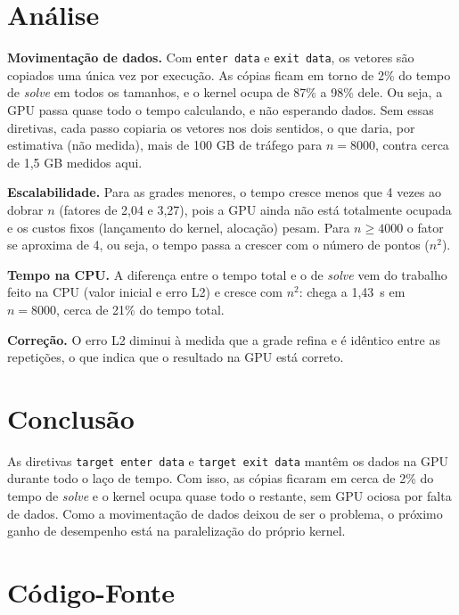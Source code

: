 \documentclass[a4paper,12pt]{article}
\begin{document}
\section{Análise}

\textbf{Movimentação de dados.} Com \texttt{enter data} e \texttt{exit data}, os
vetores são copiados uma única vez por execução. As cópias ficam em torno de
2\% do tempo de \textit{solve} em todos os tamanhos, e o kernel ocupa de 87\% a
98\% dele. Ou seja, a GPU passa quase todo o tempo calculando, e não esperando
dados. Sem essas diretivas, cada passo copiaria os vetores nos dois sentidos, o
que daria, por estimativa (não medida), mais de 100 GB de tráfego para
$n = 8000$, contra cerca de 1,5 GB medidos aqui.

\textbf{Escalabilidade.} Para as grades menores, o tempo cresce menos que 4
vezes ao dobrar $n$ (fatores de 2,04 e 3,27), pois a GPU ainda não está
totalmente ocupada e os custos fixos (lançamento do kernel, alocação)
pesam. Para $n \geq 4000$ o fator se aproxima de 4, ou seja, o tempo passa a
crescer com o número de pontos ($n^2$).

\textbf{Tempo na CPU.} A diferença entre o tempo total e o de \textit{solve}
vem do trabalho feito na CPU (valor inicial e erro L2) e cresce com $n^2$: chega
a 1,43~s em $n = 8000$, cerca de 21\% do tempo total.

\textbf{Correção.} O erro L2 diminui à medida que a grade refina e é idêntico
entre as repetições, o que indica que o resultado na GPU está correto.

\section{Conclusão}

As diretivas \texttt{target enter data} e \texttt{target exit data} mantêm os
dados na GPU durante todo o laço de tempo. Com isso, as cópias ficaram em cerca
de 2\% do tempo de \textit{solve} e o kernel ocupa quase todo o restante, sem
GPU ociosa por falta de dados. Como a movimentação de dados deixou de ser o
problema, o próximo ganho de desempenho está na paralelização do próprio
kernel.

\newpage
\appendix

\section{Código-Fonte}


\end{document}

